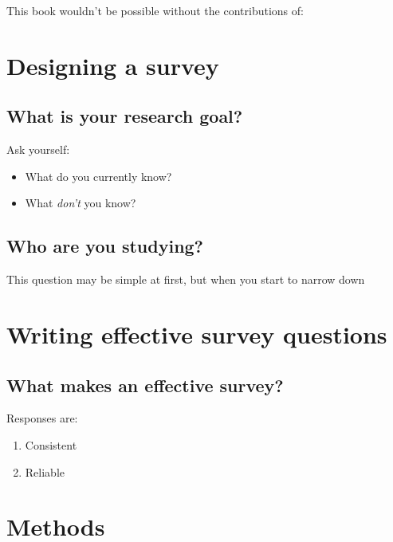 \documentclass[]{book}
\providecommand{\tightlist}{%
  \setlength{\itemsep}{0pt}\setlength{\parskip}{0pt}}
\theoremstyle{definition}
\theoremstyle{definition}
\theoremstyle{definition}
\theoremstyle{remark}
\begin{document}
This book wouldn't be possible without the contributions of:

\chapter{Designing a survey}\label{macro}

\section{What is your research goal?}\label{what-is-your-research-goal}

Ask yourself:

\begin{itemize}
\tightlist
\item
  What do you currently know?
\item
  What \emph{don't} you know?
\end{itemize}

\section{Who are you studying?}\label{who-are-you-studying}

This question may be simple at first, but when you start to narrow down

\chapter{Writing effective survey
questions}\label{writing-effective-survey-questions}

\section*{What makes an effective
survey?}\label{what-makes-an-effective-survey}

Responses are:

\begin{enumerate}
\def\labelenumi{\arabic{enumi}.}
\tightlist
\item
  Consistent\\
\item
  Reliable
\end{enumerate}

\chapter{Methods}\label{methods}
\end{document}
